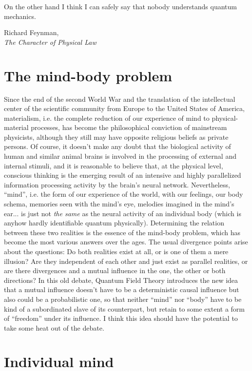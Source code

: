 \documentclass[10pt,a4paper,twoside,openany]{book}
\begin{document}
\renewcommand{\epigraphwidth}{8cm}
\epigraph{On the other hand I think I can safely say that nobody understands quantum mechanics.}{Richard Feynman,\\\textit{The Character of Physical Law}~\cite{Feynman1964}}

\section{The mind-body problem}

Since the end of the second World War and the translation of the intellectual center of the scientific community from Europe to the United States of America, materialism, i.e. the complete reduction of our experience of mind to physical-material processes, has become the philosophical conviction of mainstream physicists, although they still may have opposite religious beliefs as private persons. Of course, it doesn't make any doubt that the biological activity of human and similar animal brains is involved in the processing of external and internal stimuli, and it is reasonable to believe that, at the physical level, conscious thinking is the emerging result of an intensive and highly parallelized information processing activity by the brain's neural network. Nevertheless, ``mind'', i.e. the form of our experience of the world, with our feelings, our body schema, memories seen with the mind's eye, melodies imagined in the mind's ear... is just not \textit{the same} as the neural activity of an individual body (which is anyhow hardly identifiable quantum physically). Determining the relation between these two realities is the essence of the mind-body problem, which has become the most various answers over the ages. The usual divergence points arise about the questions: Do both realities exist at all, or is one of them a mere illusion? Are they independent of each other and just exist as parallel realities, or are there divergences and a mutual influence in the one, the other or both directions? In this old debate, Quantum Field Theory introduces the new idea that a mutual influence doesn't have to be a deterministic causal influence but also could be a probabilistic one, so that neither ``mind'' nor ``body'' have to be kind of a subordinated slave of its counterpart, but retain to some extent a form of ``freedom'' under its influence. I think this idea should have the potential to take some heat out of the debate.

\section{Individual mind}
\end{document}
